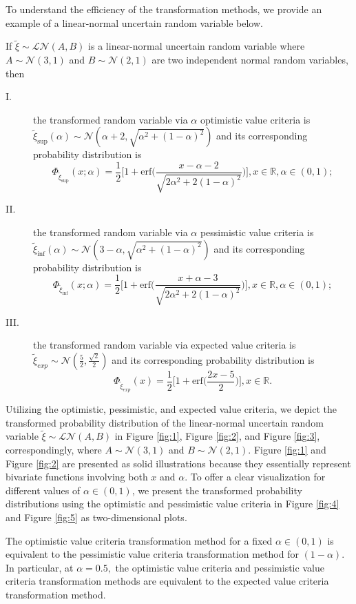 \par To understand the efficiency of the transformation methods, we provide an example of a linear-normal uncertain random variable below.
\begin{example}
	If $\tilde{\xi}\sim\mathcal{LN}(A,B)$ is a linear-normal uncertain random variable where $A\sim \mathcal{N}(3,1)$ and $B\sim \mathcal{N}(2,1)$ are two independent normal random variables, then
	\begin{description}
		\item[I.] the transformed random variable via $\alpha$ optimistic value criteria is $\tilde\xi_{\sup}(\alpha)\sim \mathcal{N}(\alpha+2,\sqrt{\alpha^2+(1-\alpha)^2})$ and its corresponding probability distribution is 
		\[\Phi_{\tilde\xi_{\sup}}(x;\alpha)=\frac{1}{2}\bigg[1+\text{erf}\bigg(\frac{x-\alpha-2}{\sqrt{2\alpha^2+2(1-\alpha)^2}}\bigg)\bigg], x\in\mathbb{R},\alpha\in (0,1);
		\]
		\item[II.] the transformed random variable via $\alpha$ pessimistic value criteria is $\tilde\xi_{\inf}(\alpha)\sim \mathcal{N}(3-\alpha,\sqrt{\alpha^2+(1-\alpha)^2})$ and its corresponding probability distribution is 
		\[\Phi_{\tilde\xi_{\inf}}(x;\alpha)=\frac{1}{2}\bigg[1+\text{erf}\bigg(\frac{x+\alpha-3}{\sqrt{2\alpha^2+2(1-\alpha)^2}}\bigg)\bigg], x\in\mathbb{R},\alpha\in (0,1);
		\]
		\item[III.] the transformed random variable via expected value criteria is $\tilde\xi_{exp}\sim \mathcal{N}(\frac{5}{2},\frac{\sqrt{2}}{2})$ and its corresponding probability distribution is 
		\[\Phi_{\tilde\xi_{exp}}(x)=\frac{1}{2}\bigg[1+\text{erf}\bigg(\frac{2x-5}{2}\bigg)\bigg], x\in\mathbb{R}.
		\]
	\end{description}
\end{example}
 Utilizing the optimistic, pessimistic, and expected value criteria, we depict the transformed probability distribution of the linear-normal uncertain random variable $\tilde{\xi}\sim\mathcal{LN}(A,B)$ in Figure \ref{fig:1}, Figure \ref{fig:2}, and Figure \ref{fig:3}, correspondingly, where $A\sim \mathcal{N}(3,1)$ and $B\sim \mathcal{N}(2,1)$. Figure \ref{fig:1} and Figure \ref{fig:2} are presented as solid illustrations because they essentially represent bivariate functions involving both $x$ and $\alpha$. To offer a clear visualization for different values of $\alpha\in (0,1)$, we present the transformed probability distributions using the optimistic and pessimistic value criteria in Figure \ref{fig:4} and Figure \ref{fig:5} as two-dimensional plots.
 \begin{remark}
 	The optimistic value criteria transformation method for a fixed $\alpha\in(0,1)$ is equivalent to the pessimistic value criteria transformation method for $(1-\alpha)$. In particular, at $\alpha = 0.5,$ the optimistic value criteria and pessimistic value criteria transformation methods are equivalent to the expected value criteria transformation method.
 \end{remark}
